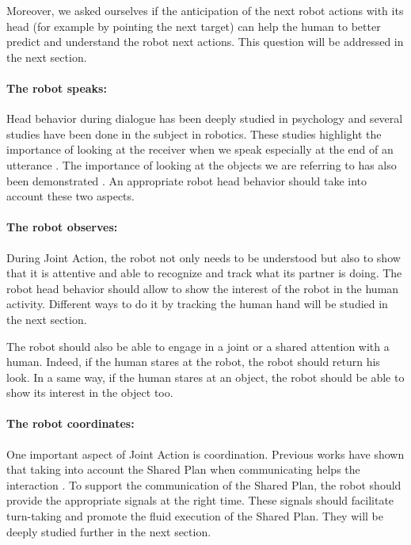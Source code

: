 \documentclass[english,a4paper,11pt,twoside]{StyleThese}
\begin{document}
Moreover, we asked ourselves if the anticipation of the next robot actions with its head (for example by pointing the next target) can help the human to better predict and understand the robot next actions.
This question will be addressed in the next section.

\paragraph{The robot speaks:}

Head behavior during dialogue has been deeply studied in psychology and several studies have been done in the subject in robotics. These studies highlight the importance of looking at the receiver when we speak especially at the end of an utterance \cite{boucher2010facilitative, skantze2014turn}. The importance of looking at the objects we are referring to has also been demonstrated \cite{mutlu2009footing, staudte2011investigating}. An appropriate robot head behavior should take into account these two aspects.

\paragraph{The robot observes:}
During Joint Action, the robot not only needs to be understood but also to show that it is attentive and able to recognize and track what its partner is doing. The robot head behavior should allow to show the interest of the robot in the human activity. Different ways to do it by tracking the human hand will be studied in the next section. 

The robot should also be able to engage in a joint or a shared attention with a human. Indeed, if the human stares at the robot, the robot should return his look. In a same way, if the human stares at an object, the robot should be able to show its interest in the object too.

\paragraph{The robot coordinates:}

One important aspect of Joint Action is coordination. Previous works have shown that taking into account the Shared Plan when communicating helps the interaction \cite{lallee2013cooperative}. To support the communication of the Shared Plan, the robot should provide the appropriate signals at the right time. These signals should facilitate turn-taking and promote the fluid execution of the Shared Plan. They will be deeply studied further in the next section.
\end{document}
